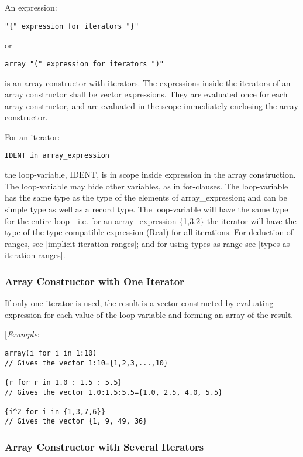 An expression:
\begin{lstlisting}[language=grammar]
"{" expression for iterators "}"
\end{lstlisting}
or
\begin{lstlisting}[language=grammar]
array "(" expression for iterators ")"
\end{lstlisting}

is an array constructor with iterators. The expressions inside the
iterators of an array constructor shall be vector expressions. They are
evaluated once for each array constructor, and are evaluated in the
scope immediately enclosing the array constructor.

For an iterator:
\begin{lstlisting}[language=modelica]
IDENT in array_expression
\end{lstlisting}

the loop-variable, IDENT, is in scope inside expression in the array
construction. The loop-variable may hide other variables, as in
for-clauses. The loop-variable has the same type as the type of the
elements of array\_expression; and can be simple type as well as a
record type. The loop-variable will have the same type for the entire
loop - i.e. for an array\_expression \{1,3.2\} the iterator will have
the type of the type-compatible expression (Real) for all iterations.
For deduction of ranges, see \autoref{implicit-iteration-ranges}; and for using types as
range see \autoref{types-as-iteration-ranges}.

\subsubsection{Array Constructor with One Iterator}

If only one iterator is used, the result is a vector constructed by
evaluating expression for each value of the loop-variable and forming an
array of the result.

{[}\emph{Example}:
\begin{lstlisting}[language=modelica]
array(i for i in 1:10)
// Gives the vector 1:10={1,2,3,...,10} 
 
{r for r in 1.0 : 1.5 : 5.5} 
// Gives the vector 1.0:1.5:5.5={1.0, 2.5, 4.0, 5.5} 
 
{i^2 for i in {1,3,7,6}} 
// Gives the vector {1, 9, 49, 36}
\end{lstlisting}
\subsubsection{Array Constructor with Several Iterators}

